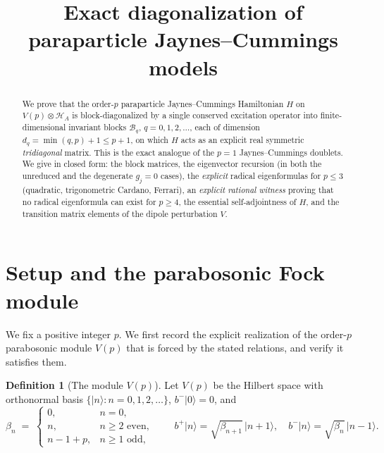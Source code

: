 \documentclass[12pt]{article}
\theoremstyle{definition}
\newtheorem{definition}{Definition}
\theoremstyle{remark}
\newcommand{\ket}[1]{\lvert #1\rangle}
\newcommand{\bp}{b^{+}}
\newcommand{\bm}{b^{-}}
\newcommand{\HA}{\mathcal{H}_A}
\begin{document}
\title{Exact diagonalization of paraparticle Jaynes--Cummings models}
\author{}
\date{}
\maketitle

\begin{abstract}
We prove that the order-$p$ paraparticle Jaynes--Cummings Hamiltonian $H$ on
$V(p)\otimes\HA$ is block-diagonalized by a single conserved excitation operator
into finite-dimensional invariant blocks $\mathcal{B}_q$, $q=0,1,2,\dots$, each of
dimension $d_q=\min(q,p)+1\le p+1$, on which $H$ acts as an explicit real symmetric
\emph{tridiagonal} matrix. This is the exact analogue of the $p=1$
Jaynes--Cummings doublets. We give in closed form: the block matrices, the
eigenvector recursion (in both the unreduced and the degenerate $g_j=0$ cases), the
\emph{explicit} radical eigenformulas for $p\le 3$ (quadratic, trigonometric Cardano,
Ferrari), an \emph{explicit rational witness} proving that no radical eigenformula
can exist for $p\ge 4$, the essential self-adjointness of $H$, and the transition
matrix elements of the dipole perturbation $V$.
\end{abstract}

\section{Setup and the parabosonic Fock module}\label{sec:setup}

We fix a positive integer $p$. We first record the explicit realization of the
order-$p$ parabosonic module $V(p)$ that is forced by the stated relations, and
verify it satisfies them.

\begin{definition}[The module $V(p)$]\label{def:Vp}
Let $V(p)$ be the Hilbert space with orthonormal basis $\{\ket{n}:n=0,1,2,\dots\}$,
$\bm\ket{0}=0$, and
\begin{equation}\label{eq:beta}
\beta_n \;=\; \begin{cases} 0, & n=0,\\ n, & n\ge 2 \text{ even},\\ n-1+p, & n\ge 1 \text{ odd},\end{cases}
\qquad
\bp\ket{n}=\sqrt{\beta_{n+1}}\,\ket{n+1},\quad \bm\ket{n}=\sqrt{\beta_{n}}\,\ket{n-1}.
\end{equation}
\end{definition}
\end{document}
